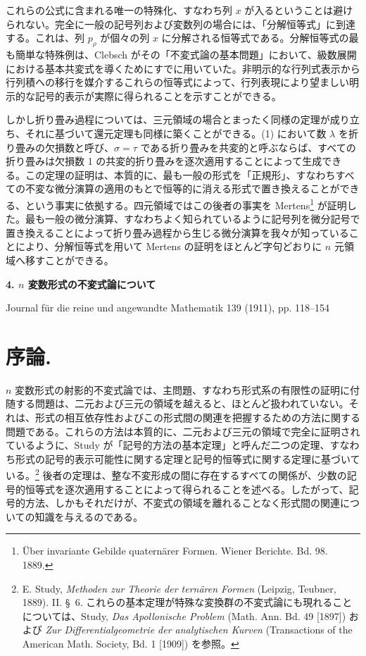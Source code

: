 \documentclass[11pt]{article}
\begin{document}
これらの公式に含まれる唯一の特殊化、すなわち列 $x$ が入るということは避けられない。完全に一般の記号列および変数列の場合には、「分解恒等式」に到達する。これは、列 $p_\rho$ が個々の列 $x$ に分解される恒等式である。分解恒等式の最も簡単な特殊例は、Clebsch がその「不変式論の基本問題」において、級数展開における基本共変式を導くためにすでに用いていた。非明示的な行列式表示から行列積への移行を媒介するこれらの恒等式によって、行列表現により望ましい明示的な記号的表示が実際に得られることを示すことができる。

しかし折り畳み過程については、三元領域の場合とまったく同様の定理が成り立ち、それに基づいて還元定理も同様に築くことができる。(1) において数 $\lambda$ を折り畳みの欠損数と呼び、$\sigma=\tau$ である折り畳みを共変的と呼ぶならば、すべての折り畳みは欠損数 1 の共変的折り畳みを逐次適用することによって生成できる。この定理の証明は、本質的に、最も一般の形式を「正規形」、すなわちすべての不変な微分演算の適用のもとで恒等的に消える形式で置き換えることができる、という事実に依拠する。四元領域ではこの後者の事実を Mertens\footnote{Über invariante Gebilde quaternärer Formen. Wiener Berichte. Bd. 98. 1889.} が証明した。最も一般の微分演算、すなわちよく知られているように記号列を微分記号で置き換えることによって折り畳み過程から生じる微分演算を我々が知っていることにより、分解恒等式を用いて Mertens の証明をほとんど字句どおりに $n$ 元領域へ移すことができる。

\clearpage
\begin{center}
{\Large\bfseries 4. $n$ 変数形式の不変式論について}\par
\vspace{1.2em}
Journal für die reine und angewandte Mathematik 139 (1911), pp. 118--154
\end{center}

\section*{序論.}
$n$ 変数形式の射影的不変式論では、主問題、すなわち形式系の有限性の証明に付随する問題は、二元および三元の領域を越えると、ほとんど扱われていない。それは、形式の相互依存性およびこの形式間の関連を把握するための方法に関する問題である。これらの方法は本質的に、二元および三元の領域で完全に証明されているように、Study が「記号的方法の基本定理」と呼んだ二つの定理、すなわち形式の記号的表示可能性に関する定理と記号的恒等式に関する定理に基づいている。\footnote{E. Study, \emph{Methoden zur Theorie der ternären Formen} (Leipzig, Teubner, 1889). II. \S\ 6. これらの基本定理が特殊な変換群の不変式論にも現れることについては、Study, \emph{Das Apollonische Problem} (Math. Ann. Bd. 49 [1897]) および \emph{Zur Differentialgeometrie der analytischen Kurven} (Transactions of the American Math. Society, Bd. 1 [1909]) を参照。} 後者の定理は、整な不変形成の間に存在するすべての関係が、少数の記号的恒等式を逐次適用することによって得られることを述べる。したがって、記号的方法、しかもそれだけが、不変式の領域を離れることなく形式間の関連についての知識を与えるのである。
\end{document}

